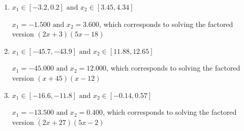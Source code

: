 \documentclass{extbook}[14pt]
\begin{document}
\begin{enumerate}
{\begin{enumerate}[label=\Alph*.]
* $x_1 = -4.500 \text{ and } x_2 = 1.200$, which is the correct option. Obtained by solving the factored version $(2x + 9)(5x -6)$
\item \( x_1 \in [-3.2, 0.2] \text{ and } x_2 \in [3.45, 4.34] \)

$x_1 = -1.500 \text{ and } x_2 = 3.600$, which corresponds to solving the factored version $(2x + 3)(5x -18)$
\item \( x_1 \in [-45.7, -43.9] \text{ and } x_2 \in [11.88, 12.65] \)

$x_1 = -45.000 \text{ and } x_2 = 12.000$, which corresponds to solving the factored version $(x + 45)(x -12)$
\item \( x_1 \in [-16.6, -11.8] \text{ and } x_2 \in [-0.14, 0.57] \)

$x_1 = -13.500 \text{ and } x_2 = 0.400$, which corresponds to solving the factored version $(2x + 27)(5x -2)$
\end{enumerate}

}
\end{enumerate}
\end{document}
